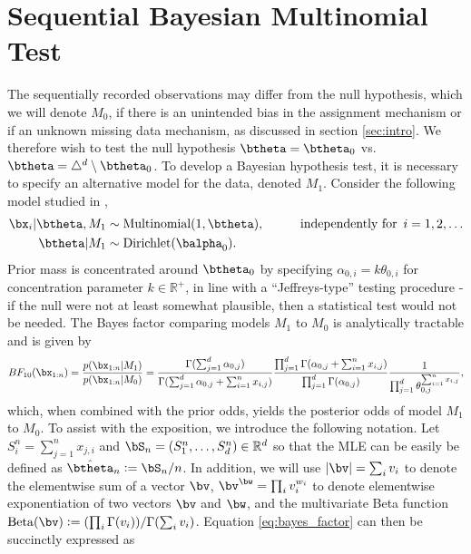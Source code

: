 \documentclass[11pt]{article}
\newcommand{\Reals}{\mathbb R}
\newcommand{\Beta}{\mathrm{Beta}}
\newcommand{\df}{\vcentcolon=}
\begin{document}
\section{Sequential Bayesian Multinomial Test}
\label{sec:srm_testing}
The sequentially recorded observations may differ from the null hypothesis, which we will denote $M_0$, if there is an unintended bias in the assignment mechanism or if an unknown missing data mechanism, as discussed in section \ref{sec:intro}.
We therefore wish to test the null hypothesis $\btheta = \btheta_0$ vs.\ $\btheta = \triangle^d \setminus \btheta_0$.
To develop a Bayesian hypothesis test, it is necessary to specify an alternative model for the data, denoted $M_1$.
Consider the following model studied in \cite{good},
\begin{align}
    \bx_i | \btheta, M_1 &\sim \text{Multinomial}(1,\btheta), \hspace{1cm} \text{independently for }\, i=1,2,\dots\\
  \btheta | M_1 &\sim \text{Dirichlet}(\balpha_0).\notag
\end{align}
Prior mass is concentrated around $\btheta_0$ by specifying $\alpha_{0,i} = k \theta_{0,i}$ for concentration parameter $k \in \mathbb{R}^+$, in line with a ``Jeffreys-type'' testing procedure - if the null were not at least somewhat plausible, then a statistical test would not be needed.
The Bayes factor comparing models $M_1$ to $M_0$ is analytically tractable and is given by
\begin{equation}
  \label{eq:bayes_factor}
 BF_{10}(\bx_{1:n}) = \frac{p(\bx_{1:n}|M_1)}{p(\bx_{1:n}|M_0)} = \frac{\Gamma(\sum_{j=1}^{d} \alpha_{0,j})}{\Gamma(\sum_{j=1}^{d} \alpha_{0,j} + \sum_{i=1}^{n}x_{i,j})}\frac{\prod_{j=1}^{d}\Gamma(\alpha_{0,j} + \sum_{i=1}^{n}x_{i,j} )}{\prod_{j=1}^{d}\Gamma(\alpha_{0,j} )}\frac{1}{\prod_{j=1}^{d} \theta_{0,j}^{\sum_{i=1}^{n}x_{i,j}}},
\end{equation}
which, when combined with the prior odds, yields the posterior odds of model $M_1$ to $M_0$.
To assist with the exposition, we introduce the following notation. 
Let $S_i^n=\sum_{j=1}^{n}x_{j,i}$ and $\bS_n=(S_1^n,\ldots, S_d^n)\in\Reals^d$
so that the MLE can be easily be defined as $\hat \btheta_n \df \bS_n/n$.
In addition, we will use $|\bv| = \sum_{i} v_i$ to denote the elementwise sum of a vector $\bv$, 
$\bv^{\bw} = \prod_{i} v_{i}^{w_i}$ to denote elementwise exponentiation of two vectors $\bv$ and $\bw$,
and the multivariate Beta function $\Beta(\bv) \df (\prod_{i}\Gamma(v_i))/\Gamma(\sum_i v_i)$. 
Equation \eqref{eq:bayes_factor} can then be succinctly expressed as 
\end{document}
